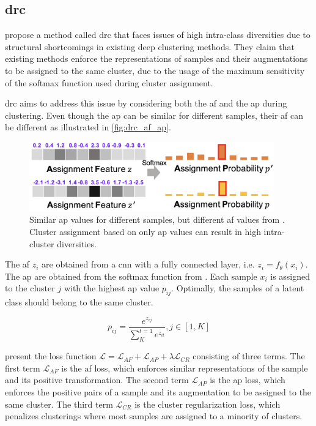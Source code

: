 \subsection{\acl{drc}}\label{subsec:drc}

\citeauthor{DRC_2020} propose a method called \ac{drc} 
that faces issues of high intra-class diversities 
due to structural shortcomings in existing deep clustering methods.
They claim that existing methods enforce the representations of samples 
and their augmentations to be assigned to the same cluster,
due to the usage of the maximum sensitivity of the softmax function used during cluster assignment.

\ac{drc} aims to address this issue by considering both the \ac{af} and the \ac{ap} during clustering.
Even though the \ac{ap} can be similar for different samples, their \ac{af} can be different 
as illustrated in \autoref{fig:drc_af_ap}.

\begin{figure}[!htb] %
    \centering
    \includegraphics[width=300pt]{images/DRC_af_ap.png}
    \caption{Similar \ac{ap} values for different samples, but different \ac{af} values from \citet{DRC_2020}.
    Cluster assignment based on only \ac{ap} values can result in high intra-cluster diversities.}
    \label{fig:drc_af_ap}
\end{figure}

The \ac{af} $z_i$ are obtained from a \ac{cnn} with a fully connected layer, i.e. $z_i = f_\theta(x_i)$.
The \ac{ap} are obtained from the softmax function from . 
Each sample $x_i$ is assigned to the cluster $j$ with the highest \ac{ap} value $p_{ij}$.
Optimally, the samples of a latent class should belong to the same cluster.

\begin{equation}
    p_{ij} = \frac{e^{z_{ij}}}{\sum_{K}^{t=1}e^{z_{it}}}, j \in \left[1,K\right]
    \label{eq:ap}
\end{equation}

\citeauthor{DRC_2020} present the loss function $\mathcal{L} = \mathcal{L}_{AF} + \mathcal{L}_{AP}  + \lambda \mathcal{L}_{CR}$  consisting of three terms.
The first term $\mathcal{L}_{AF}$ is the \ac{af} loss, which enforces similar representations of the sample and its positive transformation.
The second term $\mathcal{L}_{AP}$ is the \ac{ap} loss, which enforces the positive pairs of a sample and its augmentation 
to be assigned to the same cluster.
The third term $\mathcal{L}_{CR}$ is the cluster regularization loss, which penalizes clusterings where most samples are assigned to a minority of clusters.